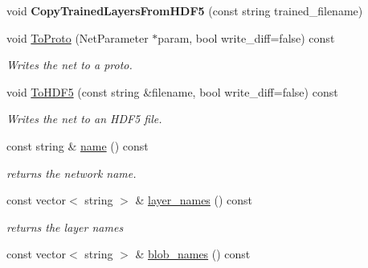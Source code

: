 \begin{DoxyCompactItemize}
\item 
void {\bfseries Copy\+Trained\+Layers\+From\+H\+D\+F5} (const string trained\+\_\+filename)\hypertarget{classcaffe_1_1Net_ab84341fd27c8c573f00c517bea051c2b}{}\label{classcaffe_1_1Net_ab84341fd27c8c573f00c517bea051c2b}

\item 
void \hyperlink{classcaffe_1_1Net_ac83257482b177c9b475a62a66aa14114}{To\+Proto} (Net\+Parameter $\ast$param, bool write\+\_\+diff=false) const \hypertarget{classcaffe_1_1Net_ac83257482b177c9b475a62a66aa14114}{}\label{classcaffe_1_1Net_ac83257482b177c9b475a62a66aa14114}

\begin{DoxyCompactList}\small\item\em Writes the net to a proto. \end{DoxyCompactList}\item 
void \hyperlink{classcaffe_1_1Net_a0f987443a3d4636166a3d5a7b000cca9}{To\+H\+D\+F5} (const string \&filename, bool write\+\_\+diff=false) const \hypertarget{classcaffe_1_1Net_a0f987443a3d4636166a3d5a7b000cca9}{}\label{classcaffe_1_1Net_a0f987443a3d4636166a3d5a7b000cca9}

\begin{DoxyCompactList}\small\item\em Writes the net to an H\+D\+F5 file. \end{DoxyCompactList}\item 
const string \& \hyperlink{classcaffe_1_1Net_a0e332faa353749dc063a5af0554e935d}{name} () const \hypertarget{classcaffe_1_1Net_a0e332faa353749dc063a5af0554e935d}{}\label{classcaffe_1_1Net_a0e332faa353749dc063a5af0554e935d}

\begin{DoxyCompactList}\small\item\em returns the network name. \end{DoxyCompactList}\item 
const vector$<$ string $>$ \& \hyperlink{classcaffe_1_1Net_ab1a7e4082c32eb93dc892f9ca23f34bd}{layer\+\_\+names} () const \hypertarget{classcaffe_1_1Net_ab1a7e4082c32eb93dc892f9ca23f34bd}{}\label{classcaffe_1_1Net_ab1a7e4082c32eb93dc892f9ca23f34bd}

\begin{DoxyCompactList}\small\item\em returns the layer names \end{DoxyCompactList}\item 
const vector$<$ string $>$ \& \hyperlink{classcaffe_1_1Net_ac88a3bdab52f432095e15fca9ec996da}{blob\+\_\+names} () const \hypertarget{classcaffe_1_1Net_ac88a3bdab52f432095e15fca9ec996da}{}\label{classcaffe_1_1Net_ac88a3bdab52f432095e15fca9ec996da}


\end{DoxyCompactItemize}
